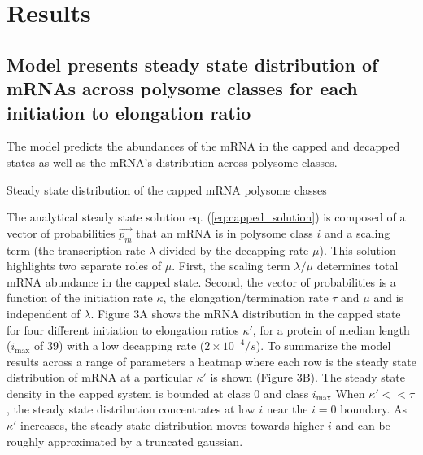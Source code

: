 \documentclass[a4,center,fleqn]{NAR}
\newcommand{\imax}{\ensuremath{{i_{\max}}}\xspace}
\begin{document}
\section{Results}

\subsection{Model presents steady state distribution of mRNAs across polysome classes for each initiation to elongation ratio}

The model predicts the abundances of the mRNA in the capped and decapped states as well as the mRNA's distribution across polysome classes.

Steady state distribution of the capped mRNA polysome classes

The analytical steady state solution eq. (\ref{eq:capped_solution}) is composed of a vector of probabilities $\vec{p_m}$ that an mRNA is in polysome class $i$ and a scaling term (the transcription rate $\lambda$ divided by the decapping rate $\mu$). 
This solution highlights two separate roles of $\mu$. 
First, the scaling term $\lambda / \mu$ determines total mRNA abundance in the capped state. 
Second, the vector of probabilities is a function of the initiation rate $\kappa$, the elongation/termination rate $\tau$ and $\mu$ and is independent of $\lambda$.
Figure 3A shows the mRNA distribution in the capped state for four different initiation to elongation ratios $\kappa'$, for a protein of median length (\imax of 39) with a low decapping rate ($2\times10^{-4} /s$).
To summarize the model results across a range of parameters a heatmap where each row is the steady state distribution of mRNA at a particular $\kappa'$ is shown (Figure 3B).
The steady state density in the capped system is bounded at class 0 and class \imax 
When $\kappa'<<\tau$, the steady state distribution concentrates at low $i$ near the $i=0$ boundary.
As $\kappa'$ increases, the steady state distribution moves towards higher $i$ and can be roughly approximated by a truncated gaussian. 
\end{document}

